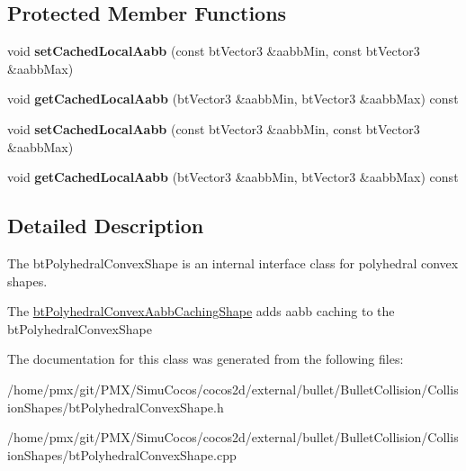 \subsection*{Protected Member Functions}
\begin{DoxyCompactItemize}
\item 
\mbox{\label{classbtPolyhedralConvexAabbCachingShape_a7ee0875ea0eba67b0fefce10ec6ba8e4}} 
void {\bfseries set\+Cached\+Local\+Aabb} (const bt\+Vector3 \&aabb\+Min, const bt\+Vector3 \&aabb\+Max)
\item 
\mbox{\label{classbtPolyhedralConvexAabbCachingShape_a44c1e82800d767dd3aecfdf07ae46eaa}} 
void {\bfseries get\+Cached\+Local\+Aabb} (bt\+Vector3 \&aabb\+Min, bt\+Vector3 \&aabb\+Max) const
\item 
\mbox{\label{classbtPolyhedralConvexAabbCachingShape_a7ee0875ea0eba67b0fefce10ec6ba8e4}} 
void {\bfseries set\+Cached\+Local\+Aabb} (const bt\+Vector3 \&aabb\+Min, const bt\+Vector3 \&aabb\+Max)
\item 
\mbox{\label{classbtPolyhedralConvexAabbCachingShape_a44c1e82800d767dd3aecfdf07ae46eaa}} 
void {\bfseries get\+Cached\+Local\+Aabb} (bt\+Vector3 \&aabb\+Min, bt\+Vector3 \&aabb\+Max) const
\end{DoxyCompactItemize}


\subsection{Detailed Description}
The bt\+Polyhedral\+Convex\+Shape is an internal interface class for polyhedral convex shapes. 

The \hyperlink{classbtPolyhedralConvexAabbCachingShape}{bt\+Polyhedral\+Convex\+Aabb\+Caching\+Shape} adds aabb caching to the bt\+Polyhedral\+Convex\+Shape 

The documentation for this class was generated from the following files\+:\begin{DoxyCompactItemize}
\item 
/home/pmx/git/\+P\+M\+X/\+Simu\+Cocos/cocos2d/external/bullet/\+Bullet\+Collision/\+Collision\+Shapes/bt\+Polyhedral\+Convex\+Shape.\+h\item 
/home/pmx/git/\+P\+M\+X/\+Simu\+Cocos/cocos2d/external/bullet/\+Bullet\+Collision/\+Collision\+Shapes/bt\+Polyhedral\+Convex\+Shape.\+cpp\end{DoxyCompactItemize}
